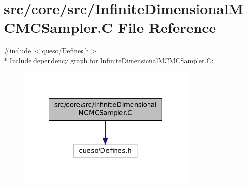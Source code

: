 \hypertarget{_infinite_dimensional_m_c_m_c_sampler_8_c}{\section{src/core/src/\-Infinite\-Dimensional\-M\-C\-M\-C\-Sampler.C File Reference}
\label{_infinite_dimensional_m_c_m_c_sampler_8_c}
}
{\ttfamily \#include $<$queso/\-Defines.\-h$>$}\\*
Include dependency graph for Infinite\-Dimensional\-M\-C\-M\-C\-Sampler.\-C\-:
\nopagebreak
\begin{figure}[H]
\begin{center}
\leavevmode
\includegraphics[width=254pt]{_infinite_dimensional_m_c_m_c_sampler_8_c__incl}
\end{center}
\end{figure}
